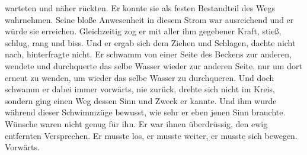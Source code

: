 \documentclass[ngerman,smalldemyvopaper,11pt,oneside,onecolumn,openright,extrafontsizes]{memoir}
\begin{document}
warteten und näher rückten. Er konnte sie als festen Bestandteil des Wegs wahrnehmen. Seine bloße Anwesenheit in diesem Strom war ausreichend und er würde sie erreichen. Gleichzeitig zog er mit aller ihm gegebener Kraft, stieß, schlug, rang und biss. Und er ergab sich dem Ziehen und Schlagen, dachte nicht nach, hinterfragte nicht. Er schwamm von einer Seite des Beckens zur anderen, wendete und durchquerte das selbe Wasser wieder zur anderen Seite, nur um dort erneut zu wenden, um wieder das selbe Wasser zu durchqueren. Und doch schwamm er dabei immer vorwärts, nie zurück, drehte sich nicht im Kreis, sondern ging einen Weg dessen Sinn und Zweck er kannte. Und ihm wurde während dieser Schwimmzüge bewusst, wie sehr er eben jenen Sinn brauchte. Wünsche waren nicht genug für ihn. Er war ihnen überdrüssig, den ewig entfernten Versprechen. Er musste los, er musste weiter, er musste sich bewegen. Vorwärts.
\end{document}
